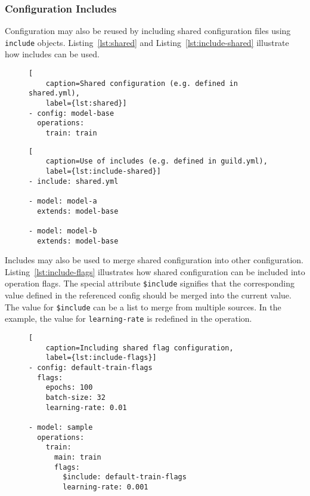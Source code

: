 \documentclass{article}
\begin{document}
\subsubsection{Configuration Includes}

Configuration may also be reused by including shared configuration
files using \verb|include| objects. Listing~\ref{lst:shared} and
Listing~\ref{lst:include-shared} illustrate how includes can be used.

\begin{figure}
\begin{lstlisting}[
    caption=Shared configuration (e.g. defined in shared.yml),
    label={lst:shared}]
- config: model-base
  operations:
    train: train
\end{lstlisting}
\end{figure}

\begin{figure}
\begin{lstlisting}[
    caption=Use of includes (e.g. defined in guild.yml),
    label={lst:include-shared}]
- include: shared.yml

- model: model-a
  extends: model-base

- model: model-b
  extends: model-base
\end{lstlisting}
\end{figure}

Includes may also be used to merge shared configuration into other
configuration. Listing~\ref{lst:include-flags} illustrates how shared
configuration can be included into operation flags. The special
attribute \verb|$include| signifies that the corresponding value
defined in the referenced config should be merged into the current
value. The value for \verb|$include| can be a list to merge from
multiple sources. In the example, the value for \verb|learning-rate|
is redefined in the operation.

\begin{figure}
\begin{lstlisting}[
    caption=Including shared flag configuration,
    label={lst:include-flags}]
- config: default-train-flags
  flags:
    epochs: 100
    batch-size: 32
    learning-rate: 0.01

- model: sample
  operations:
    train:
      main: train
      flags:
        $include: default-train-flags
        learning-rate: 0.001
\end{lstlisting}
\end{figure}

\fi
\end{document}
